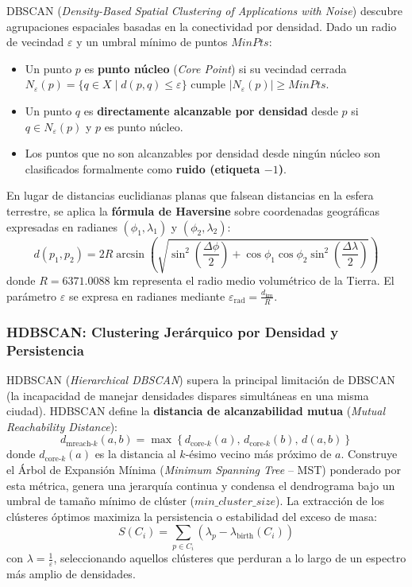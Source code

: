 DBSCAN (\textit{Density-Based Spatial Clustering of Applications with Noise}) \cite{ester1996} descubre agrupaciones espaciales basadas en la conectividad por densidad. Dado un radio de vecindad $\varepsilon$ y un umbral mínimo de puntos $MinPts$:
\begin{itemize}
    \item Un punto $p$ es \textbf{punto núcleo} (\textit{Core Point}) si su vecindad cerrada $N_\varepsilon(p) = \{q \in X \mid d(p,q) \le \varepsilon\}$ cumple $|N_\varepsilon(p)| \ge MinPts$.
    \item Un punto $q$ es \textbf{directamente alcanzable por densidad} desde $p$ si $q \in N_\varepsilon(p)$ y $p$ es punto núcleo.
    \item Los puntos que no son alcanzables por densidad desde ningún núcleo son clasificados formalmente como \textbf{ruido (etiqueta $-1$)}.
\end{itemize}

En lugar de distancias euclidianas planas que falsean distancias en la esfera terrestre, se aplica la \textbf{fórmula de Haversine} sobre coordenadas geográficas expresadas en radianes $(\phi_1, \lambda_1)$ y $(\phi_2, \lambda_2)$:
\begin{equation}
    d(p_1, p_2) = 2 R \arcsin \left( \sqrt{\sin^2\left(\frac{\Delta\phi}{2}\right) + \cos\phi_1 \cos\phi_2 \sin^2\left(\frac{\Delta\lambda}{2}\right)} \right)
\end{equation}
donde $R = 6371.0088 \text{ km}$ representa el radio medio volumétrico de la Tierra. El parámetro $\varepsilon$ se expresa en radianes mediante $\varepsilon_{\text{rad}} = \frac{d_{\text{km}}}{R}$.

\subsubsection{HDBSCAN: Clustering Jerárquico por Densidad y Persistencia}

HDBSCAN (\textit{Hierarchical DBSCAN}) \cite{campello2013} supera la principal limitación de DBSCAN (la incapacidad de manejar densidades dispares simultáneas en una misma ciudad). HDBSCAN define la \textbf{distancia de alcanzabilidad mutua} (\textit{Mutual Reachability Distance}):
\begin{equation}
    d_{\text{mreach-}k}(a, b) = \max \left\{ d_{\text{core-}k}(a), \, d_{\text{core-}k}(b), \, d(a, b) \right\}
\end{equation}
donde $d_{\text{core-}k}(a)$ es la distancia al $k$-ésimo vecino más próximo de $a$. Construye el Árbol de Expansión Mínima (\textit{Minimum Spanning Tree} -- MST) ponderado por esta métrica, genera una jerarquía continua y condensa el dendrograma bajo un umbral de tamaño mínimo de clúster ($min\_cluster\_size$). La extracción de los clústeres óptimos maximiza la persistencia o estabilidad del exceso de masa:
\begin{equation}
    S(C_i) = \sum_{p \in C_i} (\lambda_p - \lambda_{\text{birth}}(C_i))
\end{equation}
con $\lambda = \frac{1}{\varepsilon}$, seleccionando aquellos clústeres que perduran a lo largo de un espectro más amplio de densidades.

